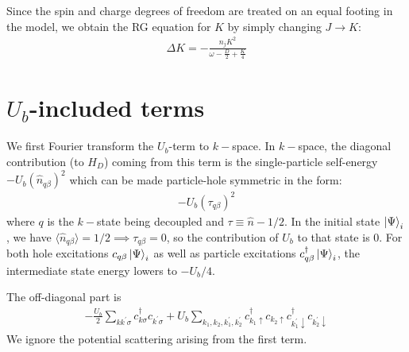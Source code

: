 \documentclass{report}
\numberwithin{equation}{section}
\begin{document}
\begin{appendices}
Since the spin and charge degrees of freedom are treated on an equal footing in the model, we obtain the RG equation for \(K\) by simply changing \(J \to K\):
\begin{equation}\begin{aligned}
	\Delta K = -\frac{n_j K^2}{\omega - \frac{D}{2} + \frac{K}{4}}
\end{aligned}\end{equation}

\section{\(U_b\)-included terms}

We first Fourier transform the \(U_b\)-term to \(k-\)space. In \(k-\)space, the diagonal contribution (to \(H_D\)) coming from this term is the single-particle self-energy \(-U_b\left(\hat n_{q \beta}\right)^2\) which can be made particle-hole symmetric in the form:
\begin{equation}\begin{aligned}
	-U_b\left(\tau_{q \beta}\right)^2
\end{aligned}\end{equation}
where \(q\) is the \(k-\)state being decoupled and \(\tau \equiv \hat n - 1/2\). In the initial state \(\ket{\Psi}_i\), we have \(\langle \hat n_{q\beta} \rangle = 1/2 \implies \tau_{q\beta} = 0\), so the contribution of \(U_b\) to that state is 0. For both hole excitations \(c_{q\beta}\ket{\Psi}_i\) as well as particle excitations \(c^\dagger_{q\beta}\ket{\Psi}_i\), the intermediate state energy lowers to \(-U_b/4\).

The off-diagonal part is
\begin{equation}\begin{aligned}
	-\frac{U_b}{2}\sum_{kk^\prime\sigma}c^\dagger_{k\sigma}c_{k^\prime\sigma} + U_b \sum_{k_1,k_2,k_1^\prime,k_2^\prime} c^\dagger_{k_1 \uparrow}c_{k_2 \uparrow} c^\dagger_{k^\prime_1 \downarrow}c_{k^\prime_2 \downarrow} 
\end{aligned}\end{equation}
We ignore the potential scattering arising from the first term.


\end{appendices}
\end{document}
